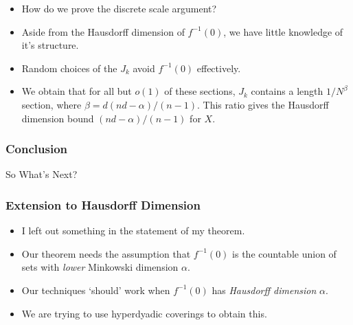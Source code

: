 \documentclass{beamer}
\begin{document}
\begin{frame}
\begin{center}
\begin{tikzpicture}[scale=0.7]
\end{tikzpicture}
\end{center}

    \begin{itemize}
        \item How do we prove the discrete scale argument?
        \pause

        \item Aside from the Hausdorff dimension of $f^{-1}(0)$, we have little knowledge of it's structure.
        \pause

        \item Random choices of the $J_k$ avoid $f^{-1}(0)$ effectively.

        \pause
        \item We obtain that for all but $o(1)$ of these sections, $J_k$ contains a length $1/N^\beta$ section, where $\beta = d(nd - \alpha)/(n - 1)$. This ratio gives the Hausdorff dimension bound $(nd-\alpha)/(n-1)$ for $X$.
    \end{itemize}
\end{frame}

\begin{frame}
    \frametitle{Conclusion}

    {\Huge So What's Next?}
\end{frame}

\begin{frame}
    \frametitle{Extension to Hausdorff Dimension}

    \begin{itemize}
        \item I left out something in the statement of my theorem.
        \pause

        \item Our theorem needs the assumption that $f^{-1}(0)$ is the countable union of sets with {\it lower} Minkowski dimension $\alpha$.
        \pause

        \item Our techniques `should' work when $f^{-1}(0)$ has {\it Hausdorff dimension} $\alpha$.
        \pause

        \item We are trying to use hyperdyadic coverings to obtain this.
    \end{itemize}
\end{frame}
\end{document}
